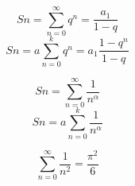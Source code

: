 
\begin{multicols}{2}
  $$\boxed{Sn= \sum_{n=0}^{\infty} q^n = \dfrac{a_1}{1-q}}$$
  $$\boxed{Sn= a\sum_{n=0}^{k} q^n = a_1 \dfrac{1-q^{n}}{1-q}}$$
\end{multicols}


\begin{multicols}{2}
  $$\boxed{Sn= \sum_{n=0}^{\infty} \dfrac{1}{n^\alpha} }$$
  $$\boxed{Sn= a\sum_{n=0}^{k} \dfrac{1}{n^\alpha}}$$
\end{multicols}


%
%
$$
\sum_{n=0}^{\infty} \dfrac{1}{n^2} = \dfrac{\pi^2}{6}
$$
